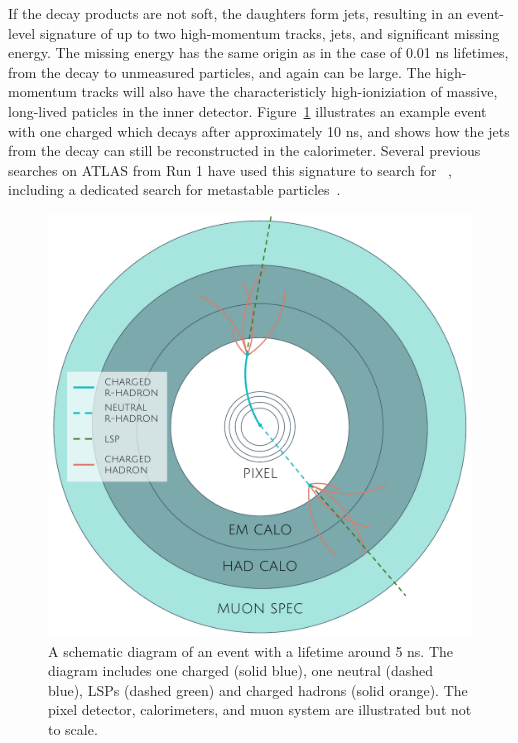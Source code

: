 If the decay products are not soft, the \rhadron daughters form jets, resulting in an event-level signature of up to two high-momentum tracks, jets, and significant missing energy.
The missing energy has the same origin as in the case of 0.01 ns lifetimes, from the decay to unmeasured particles, and again can be large.
The high-momentum tracks will also have the characteristicly high-ioniziation of massive, long-lived paticles in the inner detector.
Figure~\ref{fig:rhadron_metastable_short} illustrates an example event with one charged \rhadron which decays after approximately 10 ns, and shows how the jets from the decay can still be reconstructed in the calorimeter.
Several previous searches on \ac{ATLAS} from Run 1 have used this signature to search for \rhadrons~\cite{SUSY-2012-01, SUSY-2013-22}, including a dedicated search for metastable particles~\cite{SUSY-2014-09}.

\begin{figure}[h!]
\centering
\includegraphics[width=\halffig]{figures/rhadron_metastable_short.pdf}
\caption{A schematic diagram of an \rhadron event with a lifetime around 5 ns. The diagram includes one charged \rhadron (solid blue), one neutral \rhadron (dashed blue), \acp{LSP} (dashed green) and charged hadrons (solid orange). The pixel detector, calorimeters, and muon system are illustrated but not to scale.}
\label{fig:rhadron_metastable_short}
\end{figure}


